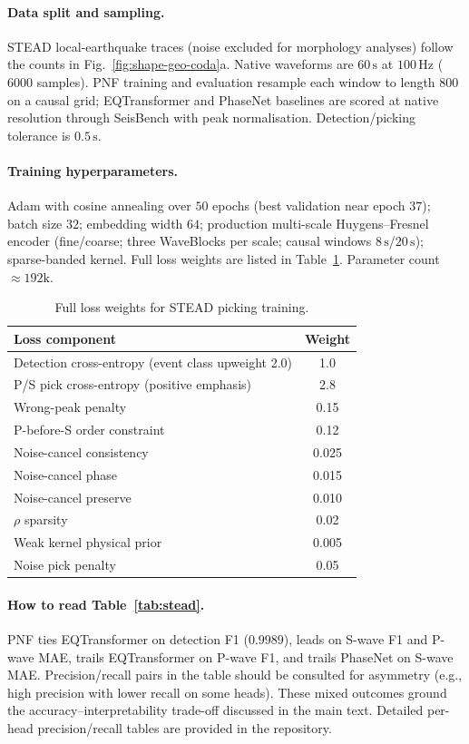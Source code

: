 \documentclass[twocolumn, 10pt]{article}
\newcommand{\pnf}{\textsc{PNF}}
\begin{document}
\paragraph{Data split and sampling.}
STEAD local-earthquake traces (noise excluded for morphology analyses) follow the counts in Fig.~\ref{fig:shape-geo-coda}a. Native waveforms are \(60\,\mathrm{s}\) at \(100\,\mathrm{Hz}\) (\(6000\) samples). \pnf{} training and evaluation resample each window to length \(800\) on a causal grid; EQTransformer and PhaseNet baselines are scored at native resolution through SeisBench with peak normalisation. Detection/picking tolerance is \(0.5\,\mathrm{s}\)\cite{mousavi2020eqt}.

\paragraph{Training hyperparameters.}
Adam with cosine annealing over \(50\) epochs (best validation near epoch \(37\)); batch size \(32\); embedding width \(64\); production multi-scale Huygens--Fresnel encoder (fine/coarse; three WaveBlocks per scale; causal windows \(8\,\mathrm{s}\)/\(20\,\mathrm{s}\)); sparse-banded kernel. Full loss weights are listed in Table~\ref{tab:s1_loss_weights}. Parameter count \(\approx192\mathrm{k}\).

\begin{table}[htbp]
\centering
\caption{Full loss weights for STEAD picking training.}
\label{tab:s1_loss_weights}
\begin{tabular}{l c}
\toprule
Loss component & Weight \\
\midrule
Detection cross-entropy (event class upweight 2.0) & 1.0 \\
P/S pick cross-entropy (positive emphasis) & 2.8 \\
Wrong-peak penalty & 0.15 \\
P-before-S order constraint & 0.12 \\
Noise-cancel consistency & 0.025 \\
Noise-cancel phase & 0.015 \\
Noise-cancel preserve & 0.010 \\
$\rho$ sparsity & 0.02 \\
Weak kernel physical prior & 0.005 \\
Noise pick penalty & 0.05 \\
\bottomrule
\end{tabular}
\end{table}

\paragraph{How to read Table~\ref{tab:stead}.}
\pnf{} ties EQTransformer on detection F1 (\(0.9989\)), leads on S-wave F1 and P-wave MAE, trails EQTransformer on P-wave F1, and trails PhaseNet on S-wave MAE. Precision/recall pairs in the table should be consulted for asymmetry (e.g., high precision with lower recall on some heads). These mixed outcomes ground the accuracy--interpretability trade-off discussed in the main text. Detailed per-head precision/recall tables are provided in the repository.
\end{document}
